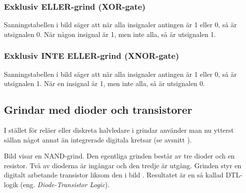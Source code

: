 \subsubsection{Exklusiv ELLER-grind (XOR-gate)}


Sanningstabellen i bild  säger att när alla insignaler antingen är 1 eller 0, så är utsignalen 0.
När någon insignal är 1, men inte alla, så är utsignalen 1.

\subsubsection{Exklusiv INTE ELLER-grind (XNOR-gate)}


Sanningstabellen i bild  säger att när alla insignaler antingen är 1 eller 0, så är utsignalen 1.
När en insignal är 1, men inte alla, så är utsignalen 0.

\subsection{Grindar med dioder och transistorer}

I stället för reläer eller diskreta halvledare i grindar använder man nu ytterst sällan något annat än integrerade digitala kretsar (se avsnitt ).



Bild  visar en NAND-grind.
Den egentliga grinden består av tre dioder och en resistor.
Två av dioderna är ingångar och den tredje är utgång.
Grinden styr en digitalt arbetande transistor liksom den i bild
.
Resultatet är en så kallad DTL-logik (eng. \emph{Diode-Transistor Logic}).

